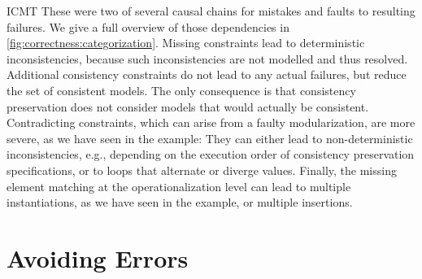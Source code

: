 \begin{copiedFrom}{ICMT}
These were two of several causal chains for mistakes and faults to resulting failures.
We give a full overview of those dependencies in \autoref{fig:correctness:categorization}.
Missing constraints lead to deterministic inconsistencies, because such inconsistencies are not modelled and thus resolved.
Additional consistency constraints do not lead to any actual failures, but reduce the set of consistent models. 
The only consequence is that consistency preservation does not consider models that would actually be consistent.
Contradicting constraints, which can arise from a faulty modularization, are more severe, as we have seen in the example:
They can either lead to non-deterministic inconsistencies, e.g., depending on the execution order of consistency preservation specifications, or to loops that alternate or diverge values.
Finally, the missing element matching at the operationalization level can lead to multiple instantiations, as we have seen in the example, or multiple insertions. %



\section{Avoiding Errors}


\end{copiedFrom}
